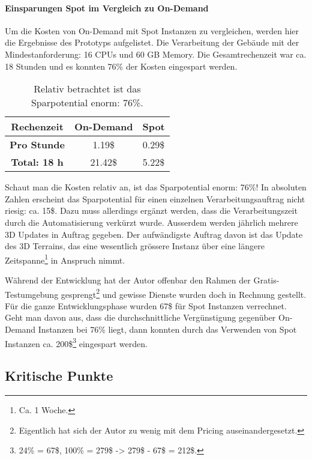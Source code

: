 \paragraph{Einsparungen Spot im Vergleich zu On-Demand}
Um die Kosten von On-Demand mit Spot Instanzen zu vergleichen, werden hier die Ergebnisse des Prototyps aufgelistet. Die Verarbeitung der Gebäude mit der Mindestanforderung: 16 CPUs und 60 GB Memory. Die Gesamtrechenzeit war ca. 18 Stunden und es konnten 76\% der Kosten eingespart werden.

\begin{table}[!htbp]
\begin{center}
\begin{tabular}{| c | c | c |}
    \hline
	\textbf{Rechenzeit} & \textbf{On-Demand} & \textbf{Spot}\\
	\hline
	 \textbf{Pro Stunde} & 1.19\$ & 0.29\$\\
	\hline
	 \textbf{Total: 18 h} & 21.42\$ & 5.22\$\\
	\hline
\end{tabular}
\caption{\label{tab:price_difference}Relativ betrachtet ist das Sparpotential enorm: 76\%.}
\end{center}
\end{table}

Schaut man die Kosten relativ an, ist das Sparpotential enorm: 76\%! In absoluten Zahlen erscheint das Sparpotential für einen einzelnen Verarbeitungsauftrag nicht riesig: ca. 15\$. Dazu muss allerdings ergänzt werden, dass die Verarbeitungszeit durch die Automatisierung verkürzt wurde. Ausserdem werden jährlich mehrere 3D Updates in Auftrag gegeben. Der aufwändigste Auftrag davon ist das Update des 3D Terrains, das eine wesentlich grössere Instanz über eine längere Zeitspanne\footnote{Ca. 1 Woche.} in Anspruch nimmt.

Während der Entwicklung hat der Autor offenbar den Rahmen der Gratis-Testumgebung gesprengt\footnote{Eigentlich hat sich der Autor zu wenig mit dem Pricing auseinandergesetzt.} und gewisse Dienste wurden doch in Rechnung gestellt. Für die ganze Entwicklungsphase wurden 67\$ für Spot Instanzen verrechnet. Geht man davon aus, dass die durchschnittliche Vergünstigung gegenüber On-Demand Instanzen bei 76\% liegt, dann konnten durch das Verwenden von Spot Instanzen ca. 200\$\footnote{24\% = 67\$, 100\% = 279\$ -> 279\$ - 67\$ = 212\$.} eingespart werden. 

\subsection{Kritische Punkte}

